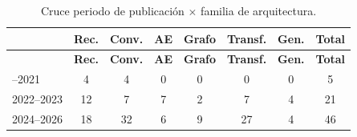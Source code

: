 \begingroup
\small
\begin{xltabular}{\linewidth}{Xccccccc}
\caption{Cruce periodo de publicaci\'{o}n $\times$ familia de arquitectura.}\label{tab:cruce_anio}\\
\toprule
\textbf{} & \textbf{Rec.} & \textbf{Conv.} & \textbf{AE} & \textbf{Grafo} & \textbf{Transf.} & \textbf{Gen.} & \textbf{Total} \\
\midrule\endfirsthead
\toprule
\textbf{} & \textbf{Rec.} & \textbf{Conv.} & \textbf{AE} & \textbf{Grafo} & \textbf{Transf.} & \textbf{Gen.} & \textbf{Total} \\
\midrule\endhead
\bottomrule{}--2021 & 4 & 4 & 0 & 0 & 0 & 0 & 5 \\
2022--2023 & 12 & 7 & 7 & 2 & 7 & 4 & 21 \\
2024--2026 & 18 & 32 & 6 & 9 & 27 & 4 & 46 \\
\end{xltabular}
\endgroup
